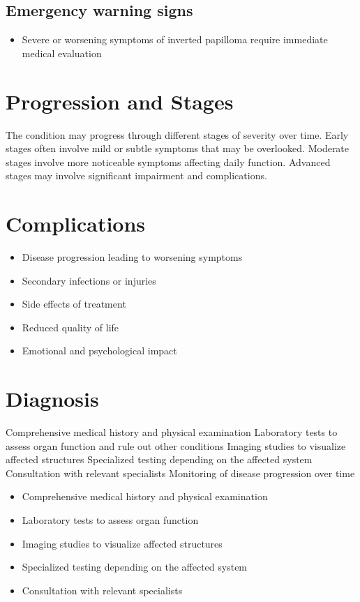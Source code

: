 \subsection{Emergency warning signs}
\begin{itemize}[noitemsep]
  \item Severe or worsening symptoms of inverted papilloma require immediate medical evaluation
\end{itemize}
\section{Progression and Stages}
The condition may progress through different stages of severity over time. Early stages often involve mild or subtle symptoms that may be overlooked. Moderate stages involve more noticeable symptoms affecting daily function. Advanced stages may involve significant impairment and complications.
\section{Complications}
\begin{itemize}[noitemsep]
  \item Disease progression leading to worsening symptoms
  \item Secondary infections or injuries
  \item Side effects of treatment
  \item Reduced quality of life
  \item Emotional and psychological impact
\end{itemize}
\section{Diagnosis}
Comprehensive medical history and physical examination Laboratory tests to assess organ function and rule out other conditions Imaging studies to visualize affected structures Specialized testing depending on the affected system Consultation with relevant specialists Monitoring of disease progression over time

\begin{itemize}[noitemsep]
  \item Comprehensive medical history and physical examination
  \item Laboratory tests to assess organ function
  \item Imaging studies to visualize affected structures
  \item Specialized testing depending on the affected system
  \item Consultation with relevant specialists
\end{itemize}
